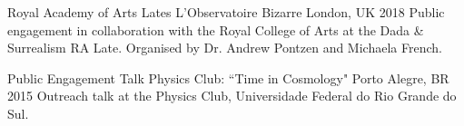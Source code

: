 \begin{cventries}
  \cventry
    {Royal Academy of Arts Lates} %
    {L'Observatoire Bizarre } %
    {London, UK} %
    {2018} %
    {
    {Public engagement in collaboration with the Royal College of Arts at the Dada \&
Surrealism RA Late. Organised by Dr. Andrew Pontzen and Michaela French.}
    }

  \cventry
    {Public Engagement Talk} %
    {Physics Club: ``Time in Cosmology"} %
    {Porto Alegre, BR} %
    {2015} %
    {
  {Outreach talk at the Physics Club, Universidade Federal do Rio Grande do Sul.}
    }
\end{cventries}
